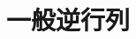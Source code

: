 \documentclass[../../topic_linear-algebra]{subfiles}
\begin{document}
\chapter{一般逆行列}



\end{document}
